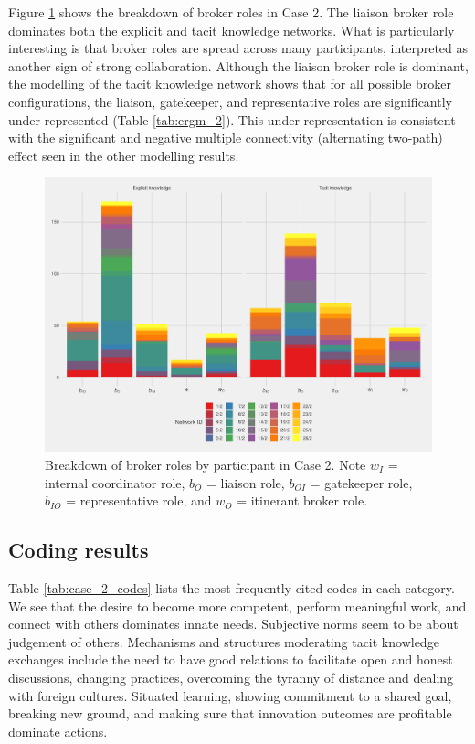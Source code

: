 Figure \ref{fig:gf_c2} shows the breakdown of broker roles in Case 2. The liaison broker role dominates both the explicit and tacit knowledge networks. What is particularly interesting is that broker roles are spread across many participants, interpreted as another sign of strong collaboration. Although the liaison broker role is dominant, the modelling of the tacit knowledge network shows that for all possible broker configurations, the liaison, gatekeeper, and representative roles are significantly under-represented (Table \ref{tab:ergm_2}). This under-representation is consistent with the significant and negative multiple connectivity (alternating two-path) effect seen in the other modelling results.

\begin{figure}
\centering
\includegraphics[width = \textwidth]{Images/gf_case2.pdf}
\caption[Breakdown of broker roles by participant in Case 2]{Breakdown of broker roles by participant in Case 2. Note $w_I$ = internal coordinator role, $b_O$ = liaison role, $b_{OI}$ = gatekeeper role, $b_{IO}$ = representative role, and $w_O$ = itinerant broker role.}
\label{fig:gf_c2}
\end{figure}

\subsection{Coding results}

Table \ref{tab:case_2_codes} lists the most frequently cited codes in each category. We see that the desire to become more competent, perform meaningful work, and connect with others dominates innate needs. Subjective norms seem to be about judgement of others. Mechanisms and structures moderating tacit knowledge exchanges include the need to have good relations to facilitate open and honest discussions, changing practices,  overcoming the tyranny of distance and dealing with foreign cultures. Situated learning, showing commitment to a shared goal, breaking new ground, and making sure that innovation outcomes are profitable dominate actions.

